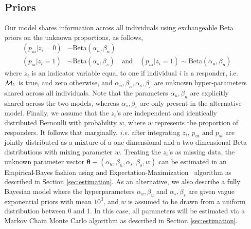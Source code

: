 \documentclass[11pt]{article}
\begin{document}
\subsection{Priors}
Our model shares information across all individuals using exchangeable Beta priors on the unknown proportions, as follows, 
 \begin{align}
(p_{ui} | z_{i}=0)  &\sim \mathrm{Beta}(\alpha_u, \beta_u)\label{eq:prior-null}\\
(p_{si} | z_{i}=1)  &\sim \mathrm{Beta}(\alpha_s,\beta_s) \quad\mathrm{and}\quad (p_{ui}|z_{i}=1) \sim \mathrm{Beta}(\alpha_u, \beta_u) \label{eq:prior-alternative}
 \end{align}
where $z_i$ is an indicator variable equal to one if individual $i$ is a responder, i.e.  ${\cal M}_1$ is true, and zero otherwise, and $\alpha_u, \beta_u, \alpha_s,\beta_s$ are unknown hyper-parameters shared across all individuals. Note that the parameters $\alpha_u, \beta_u$ are explicitly shared across the two models, whereas $\alpha_s,\beta_s$ are only present in the alternative model. Finally, we assume that the $z_i$'s are independent and identically distributed Bernoulli with probability $w$, where $w$ represents the proportion of responders. It follows that marginally, \textit{i.e.} after integrating $z_i$, $p_{ui}$ and $p_{si}$ are jointly distributed as a mixture of a one dimensional and a two dimensional Beta distributions with mixing parameter $w$. Treating the $z_i$'s as missing data, the unknown parameter vector $\boldsymbol\theta\equiv(\alpha_u, \beta_u, \alpha_s,\beta_s, w)$ can be estimated in an Empirical-Bayes fashion using and Expectation-Maximization~\cite{Dempster:1977ul} algorithm as described in Section \ref{sec:estimation}. As an alternative, we also describe a fully Bayesian model where the hyperparameters $\alpha_u, \beta_u$ and $\alpha_s, \beta_s$ are given vague exponential priors with mean $10^3$, and $w$ is assumed to be drawn from a uniform distribution between 0 and 1. In this case, all parameters will be estimated via a Markov Chain Monte Carlo algorithm as described in Section \ref{sec:estimation}. 
\end{document}
